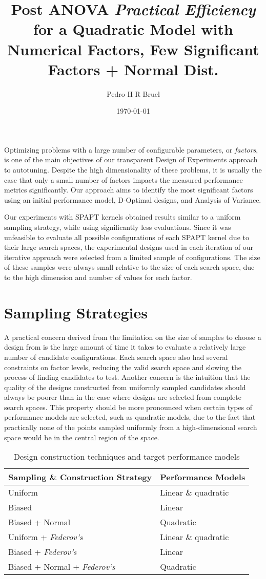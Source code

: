 \documentclass[11pt]{article}
\author{Pedro H R Bruel}
\date{\today}
\title{Post ANOVA \emph{Practical Efficiency} for a Quadratic Model with Numerical Factors, Few Significant Factors + Normal Dist.}
\begin{document}
\maketitle
Optimizing problems with a large number of configurable parameters, or
\emph{factors}, is one of the main objectives of our transparent Design of
Experiments approach to autotuning. Despite the high dimensionality of these
problems, it is usually the case that only a small number of
factors impacts the measured performance metrics significantly. Our approach
aims to identify the most significant factors using an initial performance
model, D-Optimal designs, and Analysis of Variance.

Our experiments with SPAPT kernels obtained results similar to a uniform
sampling strategy, while using significantly less evaluations. Since it was
unfeasible to evaluate all possible configurations of each SPAPT kernel due to
their large search spaces, the experimental designs used in each iteration of
our iterative approach were selected from a limited sample of configurations.
The size of these samples were always small relative to the size of each search
space, due to the high dimension and number of values for each factor.

\section{Sampling Strategies}
\label{sec:orgcfac236}
A practical concern derived from the limitation on the size of samples to
choose a design from is the large amount of time it takes to evaluate a
relatively large number of candidate configurations. Each search space also had
several constraints on factor levels, reducing the valid search space and
slowing the process of finding candidates to test. Another concern is the
intuition that the  quality of the designs
constructed from uniformly sampled candidates should always be poorer than in
the case where designs are selected from complete search spaces. This property
should be more pronounced when certain types of performance models are selected,
such as quadratic models, due to the fact that practically none of the points
sampled uniformly from a high-dimensional search space would be in the central
region of the space.

\begin{table}[htbp]
\caption{\label{tab:orgca1b5aa}
Design construction techniques and target performance models}
\centering
\begin{tabular}{ll}
Sampling \& Construction Strategy & Performance Models\\
\hline
Uniform & Linear \& quadratic\\
Biased & Linear\\
Biased + Normal & Quadratic\\
Uniform + \emph{Federov's} & Linear \& quadratic\\
Biased + \emph{Federov's} & Linear\\
Biased + Normal + \emph{Federov's} & Quadratic\\
\end{tabular}
\end{table}
\end{document}
